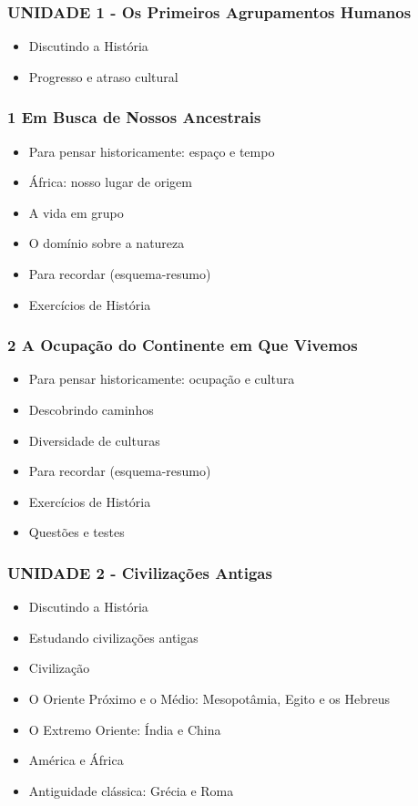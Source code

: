 \documentclass[a4paper,12pt]{article}[abntex2]
\begin{document}
\subsubsection*{UNIDADE 1 - Os Primeiros Agrupamentos Humanos}

\begin{itemize}
\item Discutindo a História
\item Progresso e atraso cultural
\end{itemize}
\subsubsection*{1 Em Busca de Nossos Ancestrais}

\begin{itemize}
\item Para pensar historicamente: espaço e tempo
\item África: nosso lugar de origem
\item A vida em grupo
\item O domínio sobre a natureza
\item Para recordar (esquema-resumo)
\item Exercícios de História
\end{itemize}
\subsubsection*{2 A Ocupação do Continente em Que Vivemos}

\begin{itemize}
\item Para pensar historicamente: ocupação e cultura
\item Descobrindo caminhos
\item Diversidade de culturas
\item Para recordar (esquema-resumo)
\item Exercícios de História
\item Questões e testes
\end{itemize}
\subsubsection*{UNIDADE 2 - Civilizações Antigas}

\begin{itemize}
\item Discutindo a História
\item Estudando civilizações antigas
\item Civilização
\item O Oriente Próximo e o Médio: Mesopotâmia, Egito e os Hebreus
\item O Extremo Oriente: Índia e China
\item América e África
\item Antiguidade clássica: Grécia e Roma
\end{itemize}
\end{document}
